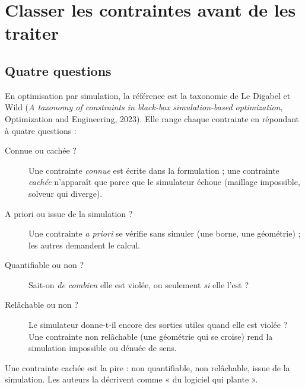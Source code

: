 \chapter{Classer les contraintes avant de les traiter}\label{ch:taxonomie}

\section{Quatre questions}
En optimisation par simulation, la référence est la taxonomie de Le Digabel et Wild (\emph{A taxonomy of constraints in black-box simulation-based optimization}, Optimization and Engineering, 2023). Elle range chaque contrainte en répondant à quatre questions :
\begin{description}
\item[Connue ou cachée ?] Une contrainte \emph{connue} est écrite dans la formulation ; une contrainte \emph{cachée} n'apparaît que parce que le simulateur échoue (maillage impossible, solveur qui diverge).
\item[A priori ou issue de la simulation ?] Une contrainte \emph{a priori} se vérifie sans simuler (une borne, une géométrie) ; les autres demandent le calcul.
\item[Quantifiable ou non ?] Sait-on \emph{de combien} elle est violée, ou seulement \emph{si} elle l'est ?
\item[Relâchable ou non ?] Le simulateur donne-t-il encore des sorties utiles quand elle est violée ? Une contrainte non relâchable (une géométrie qui se croise) rend la simulation impossible ou dénuée de sens.
\end{description}
Une contrainte cachée est la pire : non quantifiable, non relâchable, issue de la simulation. Les auteurs la décrivent comme « du logiciel qui plante ».

